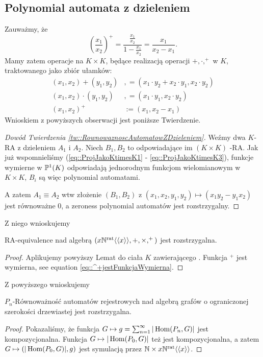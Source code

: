 \subsection{Polynomial automata z dzieleniem}
Zauważmy, że
\[
	\left( \frac{x_1}{x_2} \right)^+=\frac{\frac{x_1}{x_2}}{1-\frac{x_1}{x_2}} = \frac{x_1}{ x_2 - x_1}.
\]
Mamy zatem operacje na $K \times K$, będące realizacją operacji $+, \cdot, ^+$ w $K$, traktowanego jako zbiór ułamków: 
\begin{subequations}
	\renewcommand{\theequation}{\theparentequation.\arabic{equation}}
	\begin{align}\label{eq::ProjJakoKtimesK1}
	(x_1, x_2) + (y_1, y_2) &, = (x_1 \cdot y_2 + x_2 \cdot y_1, x_2 \cdot y_2)\\
	(x_1, x_2) \cdot (y_1, y_2) &, = (x_1 \cdot y_1, x_2 \cdot y_2) \\
	(x_1, x_2)^+      &:= (x_1, x_2 -x_1) \label{eq::ProjJakoKtimesK3}
	\end{align}
\end{subequations}
Wnioskiem z powyższych obserwacji jest poniższe Twierdzenie.
\begin{proof}[Dowód Twierdzenia \ref{tw::RownowaznoscAutomatowZDzieleniem}]
	Weźmy dwa $K$-RA z dzieleniem $A_1$ i $A_2$. Niech $B_1, B_2$ to odpowiadające im $(K \times K)$ -RA.
	Jak już wspomnieliśmy (\eqref{eq::ProjJakoKtimesK1} - \eqref{eq::ProjJakoKtimesK3}), funkcje wymierne w $\mathbb{P}^{1}(K)$ odpowiadają jednorodnym funkcjom wielomianowym w $K \times K$, $B_i$ są więc polynomial automatami.
	
	A zatem $A_1 \equiv A_2$ wtw złożenie $(B_1, B_2)$ z  $(x_1, x_2, y_1, y_2) \mapsto (x_1y_2 - y_1x_2)$ jest równoważne 0, a zeroness polynomial automatów jest rozstrzygalny.
\end{proof}
Z niego wnioskujemy
\begin{tw}
	RA-equivalence nad algebrą $(x \mathbb{ N }^{\text{rat}} \langle\langle x \rangle\rangle , +, \times, ^+)$ jest rozstrzygalna.
\end{tw}
\begin{proof}
	Aplikujemy powyższy Lemat do ciała $K$ zawierającego \Nratqr. Funkcja $^+$ jest wymierna, see equation \eqref{eq::^+jestFunkcjaWymierna}.
\end{proof}
Z powyższego wnioskujemy
\begin{tw}
	$P_n$-Równoważność automatów rejestrowych nad algebrą grafów o ograniczonej szerokości drzewiastej jest rozstrzygalna.
\end{tw}
\begin{proof}
	Pokazaliśmy, że funkcja $G \mapsto g = \sum_{n=1}^{\infty} | \operatorname{Hom}(P_n, G) |$ jest kompozycjonalna. Funkcja $G \mapsto | \operatorname{Hom}(P_0, G) |$ też jest kompozycjonalna, a zatem $G \mapsto (| \operatorname{Hom}(P_0, G) |, g)$ jest symulacją przez $\mathbb{N} \times x \mathbb{ N }^{\text{rat}} \langle\langle x \rangle\rangle $.
\end{proof}
